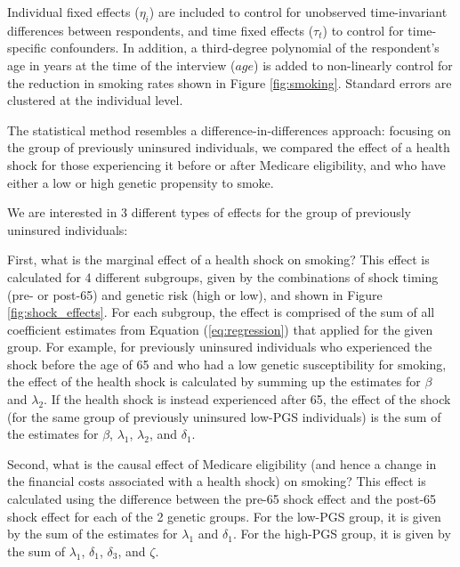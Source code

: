 \documentclass[11pt]{article}
\begin{document}
Individual fixed effects ($\eta_i$) are included to control for unobserved time-invariant differences between respondents, and time fixed effects ($\tau_t$) to control for time-specific confounders.
In addition, a third-degree polynomial of the respondent's age in years at the time of the interview ($age$) is added to non-linearly control for the reduction in smoking rates shown in Figure \ref{fig:smoking}.
Standard errors are clustered at the individual level.

The statistical method resembles a difference-in-differences approach: focusing on the group of previously uninsured individuals, we compared the effect of a health shock for those experiencing it before or after Medicare eligibility, and who have either a low or high genetic propensity to smoke.
%

We are interested in 3 different types of effects for the group of previously uninsured individuals:

First, what is the marginal effect of a health shock on smoking?
This effect is calculated for 4 different subgroups, given by the combinations of shock timing (pre- or post-65) and genetic risk (high or low), and shown in Figure \ref{fig:shock_effects}.
For each subgroup, the effect is comprised of the sum of all coefficient estimates from Equation (\ref{eq:regression}) that applied for the given group.
For example, for previously uninsured individuals who experienced the shock before the age of 65 and who had a low genetic susceptibility for smoking, the effect of the health shock is calculated by summing up the estimates for $\beta$ and $\lambda_2$.
If the health shock is instead experienced after 65, the effect of the shock (for the same group of previously uninsured low-PGS individuals) is the sum of the estimates for $\beta$, $\lambda_1$, $\lambda_2$, and $\delta_1$.

Second, what is the causal effect of Medicare eligibility (and hence a change in the financial costs associated with a health shock) on smoking?
This effect is calculated using the difference between the pre-65 shock effect and the post-65 shock effect for each of the 2 genetic groups.
For the low-PGS group, it is given by the sum of the estimates for $\lambda_1$ and $\delta_1$.
For the high-PGS group, it is given by the sum of  $\lambda_1$, $\delta_1$, $\delta_3$, and $\zeta$.
\end{document}
